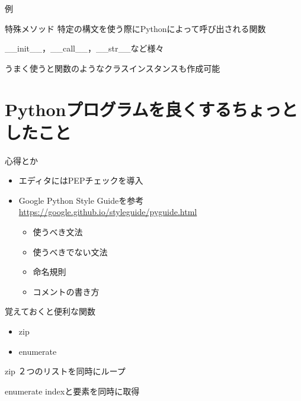 \documentclass[12pt, dvipdfmx]{beamer}
\begin{document}
\begin{frame}{例}
    \specialfunc
\end{frame}
\begin{frame}{特殊メソッド}
    特定の構文を使う際にPythonによって呼び出される関数

    \_\_init\_\_，\_\_call\_\_，\_\_str\_\_など様々

    うまく使うと関数のようなクラスインスタンスも作成可能
\end{frame}

\section{Pythonプログラムを良くするちょっとしたこと}
\begin{frame}{心得とか}
    \begin{itemize}
        \item エディタにはPEPチェックを導入
        \item Google Python Style Guideを参考\\
            {\small\url{https://google.github.io/styleguide/pyguide.html}}
        \begin{itemize}
            \item 使うべき文法
            \item 使うべきでない文法
            \item 命名規則
            \item コメントの書き方
        \end{itemize}
    \end{itemize}
\end{frame}
\begin{frame}{覚えておくと便利な関数}
    \begin{itemize}
        \item zip
        \item enumerate
    \end{itemize}
\end{frame}
\begin{frame}{zip}
    ２つのリストを同時にループ
    \zipsample
\end{frame}
\begin{frame}{enumerate}
    indexと要素を同時に取得
    \enumsample
\end{frame}
\end{document}
